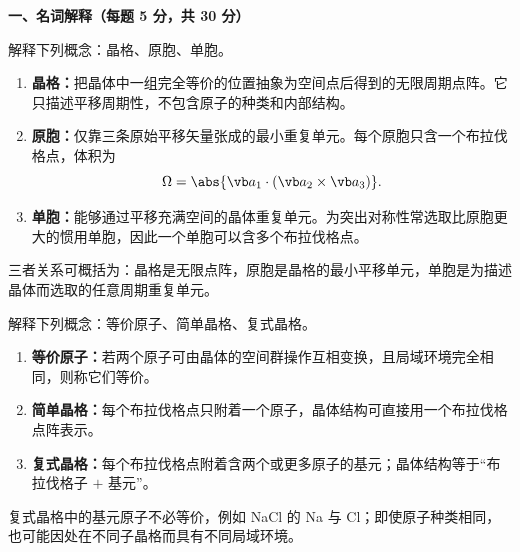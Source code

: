 
\textbf{一、名词解释（每题 5 分，共 30 分）}

\begin{question}[5 分]
解释下列概念：晶格、原胞、单胞。


\begin{solution}
\begin{enumerate}
  \item \textbf{晶格：}把晶体中一组完全等价的位置抽象为空间点后得到的无限周期点阵。它只描述平移周期性，不包含原子的种类和内部结构。
  \item \textbf{原胞：}仅靠三条原始平移矢量张成的最小重复单元。每个原胞只含一个布拉伐格点，体积为
  \[
    \Omega=\abs{\vb a_1\cdot(\vb a_2\times\vb a_3)}.
  \]
  \item \textbf{单胞：}能够通过平移充满空间的晶体重复单元。为突出对称性常选取比原胞更大的惯用单胞，因此一个单胞可以含多个布拉伐格点。
\end{enumerate}
三者关系可概括为：晶格是无限点阵，原胞是晶格的最小平移单元，单胞是为描述晶体而选取的任意周期重复单元。
\end{solution}
\end{question}

\begin{question}[5 分]
解释下列概念：等价原子、简单晶格、复式晶格。


\begin{solution}
\begin{enumerate}
  \item \textbf{等价原子：}若两个原子可由晶体的空间群操作互相变换，且局域环境完全相同，则称它们等价。
  \item \textbf{简单晶格：}每个布拉伐格点只附着一个原子，晶体结构可直接用一个布拉伐格点阵表示。
  \item \textbf{复式晶格：}每个布拉伐格点附着含两个或更多原子的基元；晶体结构等于“布拉伐格子 $+$ 基元”。
\end{enumerate}
复式晶格中的基元原子不必等价，例如 NaCl 的 Na 与 Cl；即使原子种类相同，也可能因处在不同子晶格而具有不同局域环境。
\end{solution}
\end{question}

